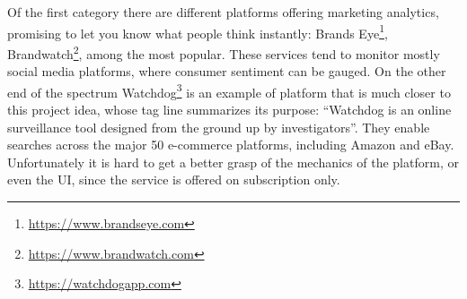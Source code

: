Of the first category there are different platforms offering marketing
analytics, promising to let you know what people think instantly: Brands
Eye\texttrademark\footnote{\url{https://www.brandseye.com}},
Brandwatch\texttrademark\footnote{\url{https://www.brandwatch.com}}, among the
most popular. These services tend to monitor mostly social media platforms,
where consumer sentiment can be gauged. On the other end of the spectrum
Watchdog\texttrademark\footnote{\url{https://watchdogapp.com}} is an example
of platform that is much closer to this project idea, whose tag line summarizes
its purpose: ``Watchdog is an online surveillance tool
designed from the ground up by investigators''\cite{wtchd}. They enable searches
across the major 50 e-commerce platforms, including Amazon and eBay.
Unfortunately it is hard to get a better grasp of the mechanics of the platform,
or even the UI, since the service is offered on subscription only.

